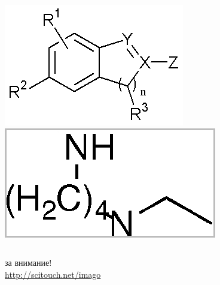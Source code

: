 \begin{frame}
\begin{columns}
\begin{column}{0.5\textwidth}
  \includegraphics[scale=0.5]{media/Markush.png} \\
  \includegraphics[scale=0.3]{media/complex2.png} \\
\end{column}
\end{columns}
\end{frame}

\begin{frame}
   \begin{center}
      за внимание! \\ 
     \url{http://scitouch.net/imago}
   \end{center}
\end{frame}


